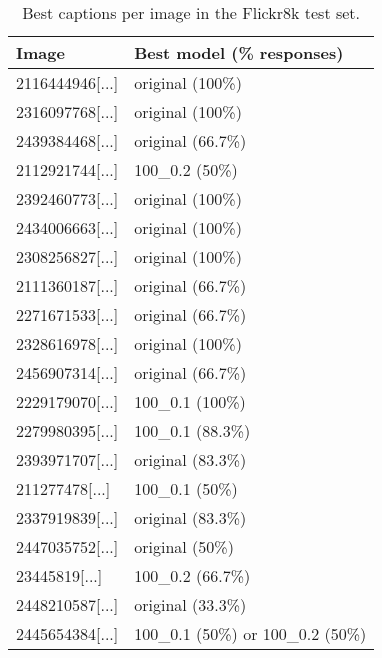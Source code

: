 \documentclass[11pt]{article}
\begin{document}
\begin{table}[h]
    \begin{center}
        \begin{tabular}{|p{2.5cm}|p{3cm}|}
            \hline \bf Image & \bf Best model (\% responses)      \\ \hline
            2116444946[...]  & original (100\%)                   \\
            2316097768[...]  & original (100\%)                   \\
            2439384468[...]  & original (66.7\%)                  \\
            2112921744[...]  & 100\_0.2 (50\%)                    \\
            2392460773[...]  & original (100\%)                   \\
            2434006663[...]  & original (100\%)                   \\
            2308256827[...]  & original (100\%)                   \\
            2111360187[...]  & original (66.7\%)                  \\
            2271671533[...]  & original (66.7\%)                  \\
            2328616978[...]  & original (100\%)                   \\
            2456907314[...]  & original (66.7\%)                  \\
            2229179070[...]  & 100\_0.1 (100\%)                   \\
            2279980395[...]  & 100\_0.1 (88.3\%)                  \\
            2393971707[...]  & original (83.3\%)                  \\
            211277478[...]   & 100\_0.1 (50\%)                    \\
            2337919839[...]  & original (83.3\%)                  \\
            2447035752[...]  & original (50\%)                    \\
            23445819[...]    & 100\_0.2 (66.7\%)                  \\
            2448210587[...]  & original (33.3\%)                  \\
            2445654384[...]  & 100\_0.1 (50\%) or 100\_0.2 (50\%) \\
            \hline
        \end{tabular}
    \end{center}
    \caption{\label{flickr-table} Best captions per image in the Flickr8k test set. }
\end{table}
\end{document}
